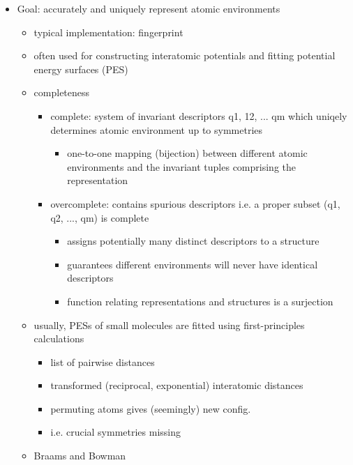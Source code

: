 \documentclass[11pt]{article}
\providecommand{\tightlist}{%
      \setlength{\itemsep}{0pt}\setlength{\parskip}{0pt}}
\begin{document}
\begin{itemize}
\tightlist
\item
  Goal: accurately and uniquely represent atomic environments

  \begin{itemize}
  \tightlist
  \item
    typical implementation: fingerprint
  \item
    often used for constructing interatomic potentials and fitting
    potential energy surfaces (PES)
  \item
    completeness

    \begin{itemize}
    \tightlist
    \item
      complete: system of invariant descriptors q1, 12, ... qm which
      uniqely determines atomic environment up to symmetries

      \begin{itemize}
      \tightlist
      \item
        one-to-one mapping (bijection) between different atomic
        environments and the invariant tuples comprising the
        representation
      \end{itemize}
    \item
      overcomplete: contains spurious descriptors i.e. a proper subset
      (q1, q2, ..., qm) is complete

      \begin{itemize}
      \tightlist
      \item
        assigns potentially many distinct descriptors to a structure
      \item
        guarantees different environments will never have identical
        descriptors
      \item
        function relating representations and structures is a surjection
      \end{itemize}
    \end{itemize}
  \item
    usually, PESs of small molecules are fitted using first-principles
    calculations

    \begin{itemize}
    \tightlist
    \item
      list of pairwise distances
    \item
      transformed (reciprocal, exponential) interatomic distances
    \item
      permuting atoms gives (seemingly) new config.
    \item
      i.e. crucial symmetries missing
    \end{itemize}
  \item
    Braams and Bowman


\end{itemize}
\end{itemize}
\end{document}
